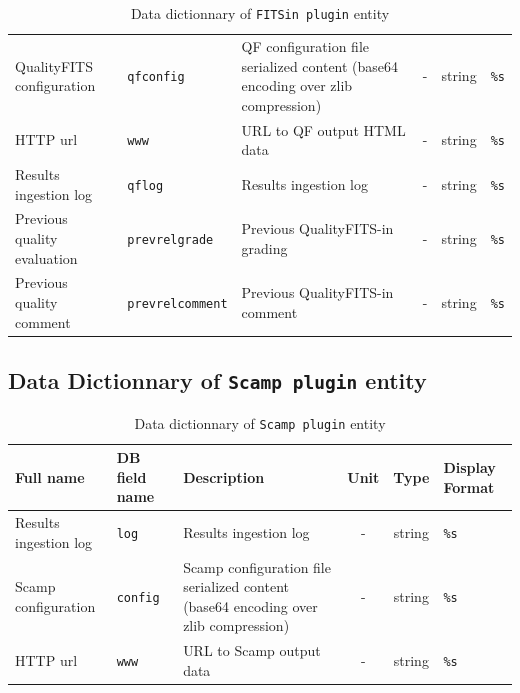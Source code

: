 \documentclass[twoside,a4paper]{article}
\begin{document}
\begin{table}
{\begin{tabular}{|l|l|l|c|c|l|}
QualityFITS configuration & {\tt qfconfig} & QF configuration file serialized content (base64 encoding over zlib compression) & - & string & {\tt \%s}\\
HTTP url & {\tt www} & URL to QF output HTML data & - & string & {\tt \%s}\\
Results ingestion log & {\tt qflog} & Results ingestion log & - & string & {\tt \%s}\\
Previous quality evaluation & {\tt prevrelgrade} & Previous QualityFITS-in grading & - & string & {\tt \%s}\\
Previous quality comment & {\tt prevrelcomment} & Previous QualityFITS-in comment & - & string & {\tt \%s}\\
\hline
\end{tabular}}
\caption{Data dictionnary of {\tt FITSin plugin} entity}
\end{table}

\subsection{Data Dictionnary of {\tt Scamp plugin} entity}
\begin{table}
\centering
\footnotesize{
\begin{tabular}{|l|l|l|c|c|l|}
\hline
Full name & DB field name & Description & Unit & Type & Display Format\\
\hline
Results ingestion log & {\tt log} & Results ingestion log & - & string & {\tt \%s}\\
Scamp configuration & {\tt config} & Scamp configuration file serialized content (base64 encoding over zlib compression) & - & string & {\tt \%s}\\
HTTP url & {\tt www} & URL to Scamp output data & - & string & {\tt \%s}\\
\hline
\end{tabular}}
\caption{Data dictionnary of {\tt Scamp plugin} entity}
\end{table}

\end{document}
